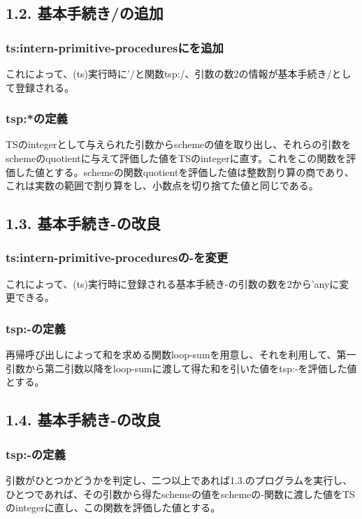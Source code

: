 \documentclass{jarticle}
\begin{document}
\subsection{1.2. 基本手続き/の追加}
\subsubsection{ts:intern-primitive-proceduresにを追加}
これによって、(ts)実行時に'/と関数tsp:/、引数の数2の情報が基本手続き/として登録される。\par
\subsubsection{tsp:*の定義}
TSのintegerとして与えられた引数からschemeの値を取り出し、それらの引数をschemeのquotientに与えて評価した値をTSのintegerに直す。これをこの関数を評価した値とする。schemeの関数quotientを評価した値は整数割り算の商であり、これは実数の範囲で割り算をし、小数点を切り捨てた値と同じである。\par

\subsection{1.3. 基本手続き-の改良}
\subsubsection{ts:intern-primitive-proceduresの-を変更}
これによって、(ts)実行時に登録される基本手続き-の引数の数を2から'anyに変更できる。\par
\subsubsection{tsp:-の定義}
再帰呼び出しによって和を求める関数loop-sumを用意し、それを利用して、第一引数から第二引数以降をloop-sumに渡して得た和を引いた値をtsp:-を評価した値とする。\par

\subsection{1.4. 基本手続き-の改良}
\subsubsection{tsp:-の定義}
引数がひとつかどうかを判定し、二つ以上であれば1.3.のプログラムを実行し、ひとつであれば、その引数から得たschemeの値をschemeの-関数に渡した値をTSのintegerに直し、この関数を評価した値とする。
\end{document}
